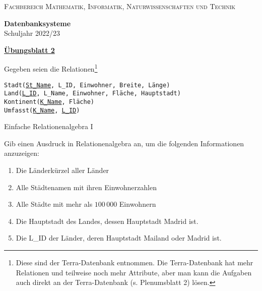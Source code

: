 \documentclass[12pt,a4paper,notitlepage,leqno]{article}
\begin{document}
\vspace{0.2cm}
\begin{minipage}[c]{0.5\textwidth}
\begin{center}
\textsc{Fachbereich Mathematik, Informatik, Naturwissenschaften und Technik}
\end{center}
\end{minipage}
\begin{minipage}[c]{0.5\textwidth}
\begin{center}
\textbf{Datenbanksysteme}\\
Schuljahr 2022/23
\end{center}
\end{minipage}

\begin{center}
\textbf{\underline{Übungsblatt 2}}

\vspace{0.2cm}
\end{center}

Gegeben seien die Relationen\footnote{Diese sind der Terra-Datenbank entnommen. Die Terra-Datenbank hat mehr Relationen und teilweise noch mehr Attribute, aber man kann die Aufgaben auch direkt an der Terra-Datenbank (s. Plenumsblatt 2) lösen.}

\begin{center}
    \texttt{Stadt(\underline{St\_Name}, L\_ID, Einwohner, Breite, Länge)}\\
    \texttt{Land(\underline{L\_ID}, L\_Name, Einwohner, Fläche, Hauptstadt)}\\
    \texttt{Kontinent(\underline{K\_Name}, Fläche)}\\
    \texttt{Umfasst(\underline{K\_Name}, \underline{L\_ID})}
\end{center}

\begin{aufgabe}{Einfache Relationenalgebra I}

Gib einen Ausdruck in Relationenalgebra an, um die folgenden Informationen anzuzeigen:

\begin{enumerate}
    \item Die Länderkürzel aller Länder
    \item Alle Städtenamen mit ihren Einwohnerzahlen
    \item Alle Städte mit mehr als $100\,000$ Einwohnern
    \item Die Hauptstadt des Landes, dessen Hauptstadt Madrid ist.
    \item Die L\_ID der Länder, deren Hauptstadt Mailand oder Madrid ist.
\end{enumerate}

\end{aufgabe}
\end{document}
